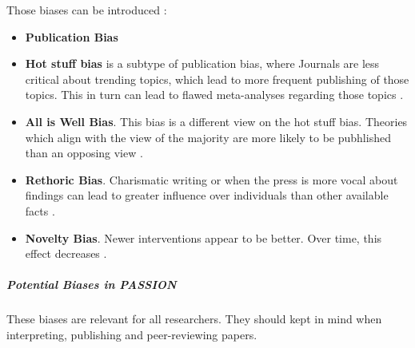 \documentclass[12pt, a4paper, oneside]{book}   	%
\begin{document}
			Those biases can be introduced :
			\begin{itemize}
				\item \textbf{Publication Bias}
				\item \textbf{Hot stuff bias} is a subtype of publication bias, where Journals are less critical about trending topics, which lead to more frequent publishing of those topics. This in turn can lead to flawed meta-analyses regarding those topics  \autocite{Chakraborty_2024, c22, c23, c19}.
				\item \textbf{All is Well Bias}. This bias is a different view on the hot stuff bias. Theories which align with the view of the majority are more likely to be pubhlished than an opposing view \autocite{Chakraborty_2024, c7,c10-12}.
				\item \textbf{Rethoric Bias}. Charismatic writing or when the press is more vocal about findings can lead to greater influence over individuals than other available facts \autocite{Chakraborty_2024}.
				\item \textbf{Novelty Bias}. Newer interventions appear to be better. Over time, this effect decreases \autocite{Chakraborty_2024}.
			\end{itemize}
			
			\subparagraph{Potential Biases in PASSION}
			These biases are relevant for all researchers. They should kept in mind when interpreting, publishing and peer-reviewing papers.
			
			
			
\end{document}
